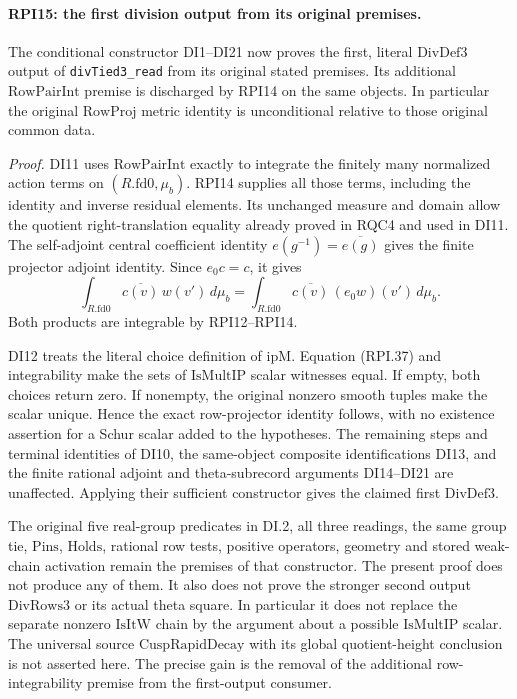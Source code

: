 \paragraph{RPI15: the first division output from its original premises.}
\label{claim:RPI15}
The conditional constructor DI1--DI21 now proves the first,
literal \(\mathrm{DivDef3}\) output of
\texttt{divTied3\_read} from its original stated premises.
Its additional \(\mathrm{RowPairInt}\) premise is discharged
by RPI14 on the same objects.  In particular the original
\(\mathrm{RowProj}\) metric identity is unconditional relative
to those original common data.

\emph{Proof.}
DI11 uses \(\mathrm{RowPairInt}\) exactly to integrate
the finitely many normalized action terms on
\((R.\mathrm{fd0},\mu_b)\).
RPI14 supplies all those terms, including the identity
and inverse residual elements.  Its unchanged measure
and domain allow the quotient right-translation equality
already proved in RQC4 and used in DI11.
The self-adjoint central coefficient identity
\(e(g^{-1})=\overline{e(g)}\) gives the finite projector
adjoint identity.  Since \(e_0c=c\), it gives
\[
 \int_{R.\mathrm{fd0}}\overline{c(v)}\,w(v')\,d\mu_b
 =
 \int_{R.\mathrm{fd0}}\overline{c(v)}\,
                      (e_0w)(v')\,d\mu_b.
 \tag{RPI.37}
\]
Both products are integrable by RPI12--RPI14.

DI12 treats the literal choice definition of \(\mathrm{ipM}\).
Equation (RPI.37) and integrability make the sets of
\(\mathrm{IsMultIP}\) scalar witnesses equal.  If empty,
both choices return zero.  If nonempty, the original
nonzero smooth tuples make the scalar unique.
Hence the exact row-projector identity follows, with no
existence assertion for a Schur scalar added to the hypotheses.
The remaining steps and terminal identities of DI10,
the same-object composite identifications DI13, and the
finite rational adjoint and theta-subrecord arguments
DI14--DI21 are unaffected.  Applying their sufficient
constructor gives the claimed first \(\mathrm{DivDef3}\).

The original five real-group predicates in DI.2, all
three readings, the same group tie, \(\mathrm{Pins}\),
\(\mathrm{Holds}\), rational row tests, positive operators,
geometry and stored weak-chain activation remain the
premises of that constructor.  The present proof does
not produce any of them.  It also does not prove the
stronger second output \(\mathrm{DivRows3}\) or its
actual theta square.  In particular it does not replace
the separate nonzero \(\mathrm{IsItW}\) chain by the
argument about a possible \(\mathrm{IsMultIP}\) scalar.
The universal source \(\mathrm{CuspRapidDecay}\) with its
global quotient-height conclusion is not asserted here.
The precise gain is the removal of the additional
row-integrability premise from the first-output consumer.
